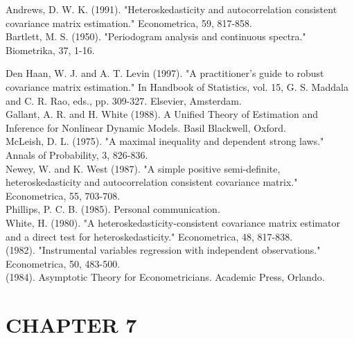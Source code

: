 \documentclass[10pt]{article}
\begin{document}
Andrews, D. W. K. (1991). "Heteroskedasticity and autocorrelation consistent covariance matrix estimation." Econometrica, 59, 817-858.\\
Bartlett, M. S. (1950). "Periodogram analysis and continuous spectra." Biometrika, 37, 1-16.

Den Haan, W. J. and A. T. Levin (1997). "A practitioner's guide to robust covariance matrix estimation." In Handbook of Statistics, vol. 15, G. S. Maddala and C. R. Rao, eds., pp. 309-327. Elsevier, Amsterdam.\\
Gallant, A. R. and H. White (1988). A Unified Theory of Estimation and Inference for Nonlinear Dynamic Models. Basil Blackwell, Oxford.\\
McLeish, D. L. (1975). "A maximal inequality and dependent strong laws." Annals of Probability, 3, 826-836.\\
Newey, W. and K. West (1987). "A simple positive semi-definite, heteroskedasticity and autocorrelation consistent covariance matrix." Econometrica, 55, 703-708.\\
Phillips, P. C. B. (1985). Personal communication.\\
White, H. (1980). "A heteroskedasticity-consistent covariance matrix estimator and a direct test for heteroskedasticity." Econometrica, 48, 817-838.\\
(1982). "Instrumental variables regression with independent observations." Econometrica, 50, 483-500.\\
(1984). Asymptotic Theory for Econometricians. Academic Press, Orlando.

\section*{CHAPTER 7}
\end{document}
